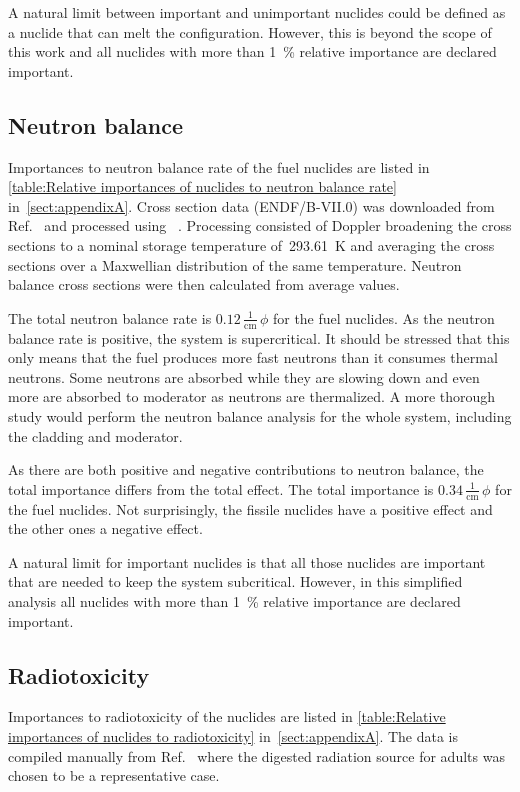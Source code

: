 A natural limit between important and unimportant nuclides could be defined as a nuclide that can melt the configuration. However, this is beyond the scope of this work and all nuclides with more than \SI{1}{\%} relative importance are declared important.

\subsection{Neutron balance}

Importances to neutron balance rate of the fuel nuclides are listed in \autoref{table:Relative importances of nuclides to neutron balance rate} in~\autoref{sect:appendixA}. Cross section data (ENDF/B-VII.0) was downloaded from Ref.~\cite{endf} and processed using \njoy~\cite{lanl_njoy}. Processing consisted of Doppler broadening the cross sections to a nominal storage temperature of~\SI{293.61}{\kelvin} and averaging the cross sections over a Maxwellian distribution of the same temperature. Neutron balance cross sections were then calculated from average values.

The total neutron balance rate is $0.12\,\frac{1}{\mathrm{cm}}\,\phi$ for the fuel nuclides. As the neutron balance rate is positive, the system is supercritical. It should be stressed that this only means that the fuel produces more fast neutrons than it consumes thermal neutrons. Some neutrons are absorbed while they are slowing down and even more are absorbed to moderator as neutrons are thermalized. A more thorough study would perform the neutron balance analysis for the whole system, including the cladding and moderator.

As there are both positive and negative contributions to neutron balance, the total importance differs from the total effect. The total importance is $0.34\,\frac{1}{\mathrm{cm}}\,\phi$ for the fuel nuclides. Not surprisingly, the fissile nuclides have a positive effect and the other ones a negative effect.

A natural limit for important nuclides is that all those nuclides are important that are needed to keep the system subcritical. However, in this simplified analysis all nuclides with more than \SI{1}{\%} relative importance are declared important.

\subsection{Radiotoxicity}

Importances to radiotoxicity of the nuclides are listed in \autoref{table:Relative importances of nuclides to radiotoxicity} in~\autoref{sect:appendixA}. The data is compiled manually from Ref.~\cite{ST73} where the digested radiation source for adults was chosen to be a representative case.

